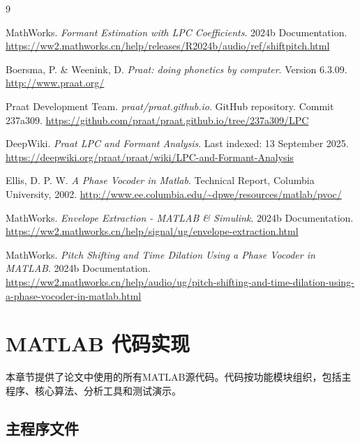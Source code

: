 \documentclass[12pt,a4paper]{article}
\newcommand{\codefolder}{./code}
\begin{document}
\begin{thebibliography}{9}

MathWorks. \textit{Formant Estimation with LPC Coefficients}. 
2024b Documentation. 
\url{https://ww2.mathworks.cn/help/releases/R2024b/audio/ref/shiftpitch.html}

Boersma, P. \& Weenink, D. \textit{Praat: doing phonetics by computer}. 
Version 6.3.09. 
\url{http://www.praat.org/}

Praat Development Team. \textit{praat/praat.github.io}. 
GitHub repository. Commit 237a309. 
\url{https://github.com/praat/praat.github.io/tree/237a309/LPC}

DeepWiki. \textit{Praat LPC and Formant Analysis}. 
Last indexed: 13 September 2025. 
\url{https://deepwiki.org/praat/praat/wiki/LPC-and-Formant-Analysis}

Ellis, D. P. W. \textit{A Phase Vocoder in Matlab}. 
Technical Report, Columbia University, 2002.
\url{http://www.ee.columbia.edu/~dpwe/resources/matlab/pvoc/}

MathWorks. \textit{Envelope Extraction - MATLAB \& Simulink}. 
2024b Documentation.
\url{https://ww2.mathworks.cn/help/signal/ug/envelope-extraction.html}

MathWorks. \textit{Pitch Shifting and Time Dilation Using a Phase Vocoder in MATLAB}. 
2024b Documentation.
\url{https://ww2.mathworks.cn/help/audio/ug/pitch-shifting-and-time-dilation-using-a-phase-vocoder-in-matlab.html}

\end{thebibliography}


\newpage
\appendix
\section{MATLAB 代码实现}
\label{app:matlab_code}

本章节提供了论文中使用的所有MATLAB源代码。代码按功能模块组织，包括主程序、核心算法、分析工具和测试演示。

\subsection{主程序文件}
\label{app:main_programs}


\end{document}
